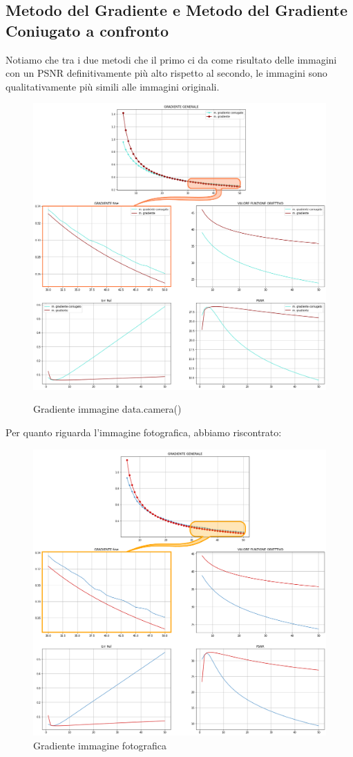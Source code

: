 \subsection{Metodo del Gradiente e Metodo del Gradiente Coniugato a confronto}

Notiamo che tra i due metodi che il primo ci da come risultato delle immagini con un PSNR 
definitivamente più alto rispetto al secondo, le immagini sono qualitativamente più simili 
alle immagini originali. 

\begin{figure}[H]
    \centering
    \includegraphics[width=\textwidth]{output/MGCvsMG-enph.png}
    \label{fig:MGCvsMG}
    \caption{Gradiente immagine data.camera()}
\end{figure}

Per quanto riguarda l'immagine fotografica, abbiamo riscontrato: 

\begin{figure}[H]
    \centering
    \includegraphics[width=\textwidth]{output/MGCvsMG-pugile-enph.png}
    \caption{Gradiente immagine fotografica}
    \label{fig:errorOutput}
\end{figure}


